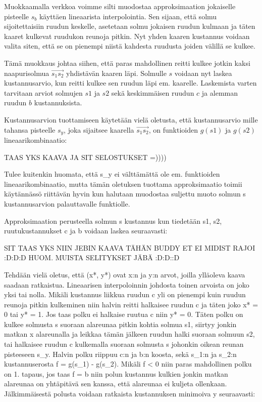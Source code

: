 \documentclass[finnish]{tktltiki2}
\theoremstyle{definition}
\theoremstyle{remark}
\begin{document}
Muokkaamalla verkkoa voimme silti muodostaa approksimaation jokaiselle pisteelle \(s_b\) käyttäen lineaarista interpolointia. Sen sijaan, että solmu sijoitettaisiin ruudun keskelle, asetetaan solmu jokaisen ruudun kulmaan ja täten kaaret kulkevat ruudukon reunoja pitkin. Nyt yhden kaaren kustannus voidaan valita siten, että se on pienempi niistä kahdesta ruudusta joiden välillä se kulkee.

Tämä muokkaus johtaa siihen, että paras mahdollinen reitti kulkee jotkin kaksi naapurisolmua $\overrightarrow{s_1s_2}$ yhdistävän kaaren läpi. Solmulle \(s\) voidaan nyt laskea kustannusarvio, kun reitti kulkee sen ruudun läpi em. kaarelle. Laskemista varten tarvitaan arviot solmujen \(s1\) ja \(s2\) sekä keskimmäisen ruudun \(c\) ja alemman ruudun \(b\) kustannuksista.

Kustannusarvion tuottamiseen käytetään vielä oletusta, että kustannusarvio mille tahansa pisteelle \(s_y\), joka sijaitsee kaarella $\overrightarrow{s_1s_2}$, on funktioiden \(g(s1)\) ja \(g(s2)\) lineaarikombinaatio:

TAAS YKS KAAVA JA SIT SELOSTUKSET =))))

Tulee kuitenkin huomata, että s_y ei välttämättä ole em. funktioiden lineaarikombinaatio, mutta tämän oletuksen tuottama approksimaatio toimii käytännässö riittävän hyvin kun halutaan muodostaa suljettu muoto solmun s kustannusarvion palauttavalle funktiolle.

Approksimaation perusteella solmun s kustannus kun tiedetään s1, s2, ruutukustannukset c ja b voidaan laskea seuraavasti:

SIT TAAS YKS NIIN JEBIN KAAVA TÄHÄN BUDDY ET EI MIDIST RAJOI :D:D:D
HUOM. MUISTA SELITYKSET JÄBÄ :D:D::D

Tehdään vielä oletus, että (x*, y*) ovat x:n ja y:n arvot, joilla ylläoleva kaava saadaan ratkaistua. Lineaarisen interpoloinnin johdosta toinen arvoista on joko yksi tai nolla. Mikäli kustannus liikkua ruudun c yli on pienempi kuin ruudun reunoja pitkin kulkeminen niin halvin reitti halkaisee ruudun c ja täten joko x* = 0 tai y* = 1. Jos taas polku ei halkaise ruutua c niin y* = 0. Täten polku on kulkee solmusta s suoraan alareunaa pitkin kohtia solmua s1, siirtyy jonkin matkan x alareunalla ja leikkaa tämän jälkeen ruudun halki suoraan solmuun s2, tai halkaisee ruudun c kulkemalla suoraan solmusta s johonkin oikean reunan pisteeseen s_y. Halvin polku riippuu c:n ja b:n koosta, sekä s_1:n ja s_2:n kustannuserosta f = g(s_1) - g(s_2). Mikäli f < 0 niin paras mahdollinen polku on 1. tapaus, jos taas f = b niin polun kustannus kulkien jonkin matkan alareunaa on yhtäpitävä sen kanssa, että alareunaa ei kuljeta ollenkaan. Jälkimmäisestä polusta voidaan ratkaista kustannuksen minimoiva y seuraavasti:
\end{document}
